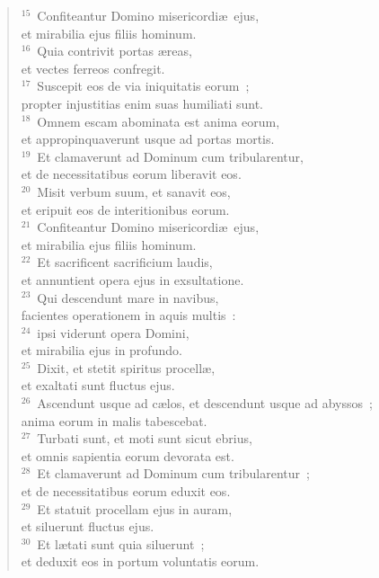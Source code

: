 \begin{flushleft}
\begin{verse}
${}^{15}$~Confiteantur Domino misericordi\ae\ ejus,\\ et mirabilia ejus filiis hominum.\\
${}^{16}$~Quia contrivit portas \ae reas,\\ et vectes ferreos confregit.\\
${}^{17}$~Suscepit eos de via iniquitatis eorum~;\\ propter injustitias enim suas humiliati sunt.\\
${}^{18}$~Omnem escam abominata est anima eorum,\\ et appropinquaverunt usque ad portas mortis.\\
${}^{19}$~Et clamaverunt ad Dominum cum tribularentur,\\ et de necessitatibus eorum liberavit eos.\\
${}^{20}$~Misit verbum suum, et sanavit eos,\\ et eripuit eos de interitionibus eorum.\\
${}^{21}$~Confiteantur Domino misericordi\ae\ ejus,\\ et mirabilia ejus filiis hominum.\\
${}^{22}$~Et sacrificent sacrificium laudis,\\ et annuntient opera ejus in exsultatione.\\
${}^{23}$~Qui descendunt mare in navibus,\\ facientes operationem in aquis multis~:\\
${}^{24}$~ipsi viderunt opera Domini,\\ et mirabilia ejus in profundo.\\
${}^{25}$~Dixit, et stetit spiritus procell\ae ,\\ et exaltati sunt fluctus ejus.\\
${}^{26}$~Ascendunt usque ad c\ae los, et descendunt usque ad abyssos~;\\ anima eorum in malis tabescebat.\\
${}^{27}$~Turbati sunt, et moti sunt sicut ebrius,\\ et omnis sapientia eorum devorata est.\\
${}^{28}$~Et clamaverunt ad Dominum cum tribularentur~;\\ et de necessitatibus eorum eduxit eos.\\
${}^{29}$~Et statuit procellam ejus in auram,\\ et siluerunt fluctus ejus.\\
${}^{30}$~Et l\ae tati sunt quia siluerunt~;\\ et deduxit eos in portum voluntatis eorum.\\

\end{verse}
\end{flushleft}
